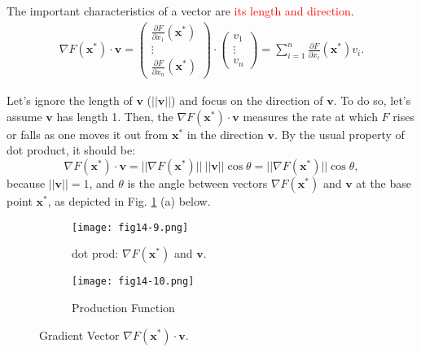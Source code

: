 \documentclass[10pt,a4paper]{book}
\newcommand{\red}[1]{\textcolor{red}{#1}}
\theoremstyle{definition}\newtheorem{definition}{Definition}
\theoremstyle{definition}\newtheorem{fact}{Fact}
\theoremstyle{definition}\newtheorem{ex}{Ex.}
\theoremstyle{definition}\newtheorem{project}{Project}
\theoremstyle{definition}\newtheorem{problem}{Problem}
\theoremstyle{definition}\newtheorem{example}{Example}
\numberwithin{theorem}{chapter}
\numberwithin{corollary}{chapter}
\numberwithin{assumption}{chapter}
\numberwithin{definition}{chapter}
\numberwithin{prop}{chapter}
\numberwithin{notation}{chapter}
\numberwithin{problem}{chapter}
\numberwithin{example}{chapter}
\numberwithin{fact}{chapter}
\numberwithin{ex}{chapter}
\def\v{\mathbf v}
\def\x{\mathbf x}
\begin{document}
	The important characteristics of a vector are \red{its length and direction}. 
	\begin{align*}
		\nabla F(\x^*) \cdot \v =                                  
		\begin{pmatrix}                                            
			\frac{\partial F}{\partial x_1} (\x^*)                     \\
			\vdots                                                     \\
			\frac{\partial F}{\partial x_n} (\x^*)                     
		\end{pmatrix}                                              
		\cdot                                                      
		\begin{pmatrix}                                            
			v_1                                                        \\
			\vdots                                                     \\
			v_n                                                        
		\end{pmatrix}                                              
		= \sum^n_{i=1} \frac{\partial F}{\partial x_i} (\x^*) v_i. 
	\end{align*}
	
	Let's ignore the length of $\v$ ($||\v||$) and focus on the direction of $\v$. To do so, let's assume $\v$ has length 1. Then, the $\nabla F(\x^*)\cdot \v$ measures the rate at which $F$ rises or falls as one moves it out from $\x^*$ in the direction $\v$. By the usual property of dot product, it should be:
	\begin{equation}
		\label{eq:dot_prod_nabla_v}
		\nabla F(\x^*)\cdot \v = || \nabla F(\x^*) || \ ||\v|| \cos\theta = ||\nabla F(\x^*) || \cos \theta,
	\end{equation}
	because $||\v||=1$, and $\theta$ is the angle between vectors $\nabla F(\x^*)$ and $\v$ at the base point $\x^*$, as depicted in Fig. \ref{fig:gradient} (a) below.
	
	\begin{figure}[ht]
		\centering
		\begin{subfigure}[b]{0.35\linewidth}
			\texttt{[image: fig14-9.png]}
			\caption{dot prod: $\nabla F(\x^*)$ and $\v$.}
		\end{subfigure}
		\begin{subfigure}[b]{0.5\linewidth}
			\texttt{[image: fig14-10.png]}
			\caption{Production Function}
		\end{subfigure}
		\caption{Gradient Vector $\nabla F(\x^*)\cdot \v$.}
		\label{fig:gradient}
	\end{figure}
	
\end{document}
